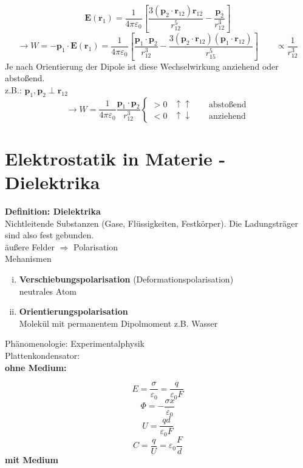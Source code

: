 \documentclass[titlepage,11pt,a4paper,ngerman]{report}
\newcommand{\tx}[1]{\textrm{#1}}
\renewcommand{\Phi}{\varPhi}
\renewcommand{\vec}[1]{\boldsymbol{#1}}
\renewcommand{\epsilon}{\varepsilon}
\begin{document}
\[\vec{E}(\vec{r}_1)=\frac{1}{4\pi\epsilon_0}\left[\frac{3(\vec{p}_2\cdot\vec{r}_{12})\vec{r}_{12}}{r_{12}^5}-\frac{\vec{p}_2}{r_{12}^3}\right]\]
\[\rightarrow W=-\vec{p}_1\cdot\vec{E}(\vec{r}_1)=\frac{1}{4\pi\epsilon_0}\left[\frac{\vec{p}_1\cdot\vec{p}_2}{r_{12}^3}-\frac{3(\vec{p}_2\cdot\vec{r}_{12})(\vec{p}_1\cdot\vec{r}_{12})}{r_{15}^5}\right] \qquad \propto\frac{1}{r_{12}^3}\]
Je nach Orientierung der Dipole ist diese Wechselwirkung anziehend oder absto\ss end.\\
z.B.: $\vec{p}_1,\vec{p}_2\perp\vec{r}_{12}$
\[\rightarrow W=\frac{1}{4\pi\epsilon_0}\frac{\vec{p}_1\cdot\vec{p}_2}{r_{12}^3}\begin{cases}>0&\uparrow\uparrow \qquad \tx{abstoßend}\\<0&\uparrow\downarrow \qquad \tx{anziehend}\end{cases}\]



\section{Elektrostatik in Materie - Dielektrika}

\textbf{Definition: Dielektrika}\\
Nichtleitende Substanzen (Gase, Flüssigkeiten, Festkörper). Die Ladungsträger sind also fest gebunden.\\[5pt]
äußere Felder $ \Rightarrow $ Polarisation\\[5pt]
Mehanismen
\begin{enumerate}[i)]
	\item \textbf{Verschiebungspolarisation} (Deformationspolarisation)\\
	neutrales Atom
	\item \textbf{Orientierungspolarisation}\\
	Molekül mit permanentem Dipolmoment z.B. Wasser
\end{enumerate}
Phänomenologie: Experimentalphysik\\
Plattenkondensator:\\
\textbf{ohne Medium:}


\begin{equation*}
E = \frac{\sigma}{\epsilon_0} = \frac{q}{\epsilon_0 F}
\end{equation*}
\begin{equation*}
\Phi = - \frac{\sigma x }{\epsilon_0}
\end{equation*}
\begin{equation*}
U = \frac{q d}{\epsilon_0 F}
\end{equation*}
\begin{equation*}
C = \frac{q}{U} = \epsilon_0 \frac{F}{d}
\end{equation*}
\textbf{mit Medium}
\end{document}
